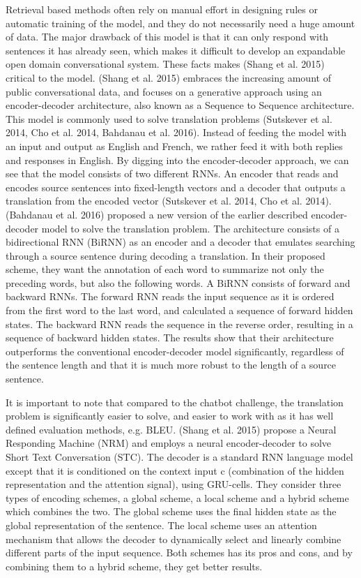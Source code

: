 \documentclass{article} %
\begin{document}
Retrieval based methods often rely on manual effort in designing rules or  automatic training of the model, and they do not necessarily need a huge amount of data. The major drawback of this model is that it can only respond with sentences it has already seen, which makes it difficult to develop an expandable open domain conversational system. These facts makes (Shang et al. 2015) critical to the model. (Shang et al. 2015) embraces the increasing amount of public conversational data, and focuses on a generative approach using an encoder-decoder architecture, also known as a Sequence to Sequence architecture. This model is commonly used to solve translation problems (Sutskever et al. 2014, Cho et al. 2014, Bahdanau et al. 2016). Instead of feeding the model with an input and output as English and French, we rather feed it with both replies and  responses in English. By digging into the encoder-decoder approach, we can see that the model consists of two different RNNs. An encoder that reads and encodes source sentences into fixed-length vectors and a decoder that outputs a translation from the encoded vector (Sutskever et al. 2014, Cho et al. 2014). (Bahdanau et al. 2016) proposed a new version of the earlier described encoder-decoder model to solve the translation problem. The architecture consists of a bidirectional RNN (BiRNN) as an encoder and a decoder that emulates searching through a source sentence during decoding a translation. In their proposed scheme, they want the annotation of each word to summarize not only the preceding words, but also the following words. A BiRNN consists of forward and backward RNNs. The forward RNN reads the input sequence as it is ordered from the first word to the last word, and calculated a sequence of forward hidden states. The backward RNN reads the sequence in the reverse order, resulting in a sequence of backward hidden states. The results show that their architecture outperforms the conventional encoder-decoder model significantly, regardless of the sentence length and that it is much more robust to the length of a source sentence.

It is important to note that compared to the chatbot challenge, the translation problem is significantly easier to solve, and easier to work with as it has well defined evaluation methods, e.g. BLEU. (Shang et al. 2015) propose a Neural Responding Machine (NRM) and employs a neural encoder-decoder to solve Short Text Conversation (STC). The decoder is a standard RNN language model except that it is conditioned on the context input c (combination of the hidden representation and the attention signal), using GRU-cells. They consider three types of encoding schemes, a global scheme, a local scheme and a hybrid scheme which combines the two. The global scheme uses the final hidden state as the global representation of the sentence. The local scheme uses an attention mechanism that allows the decoder to dynamically select and linearly combine different parts of the input sequence. Both schemes has its pros and cons, and by combining them to a hybrid scheme, they get better results. 
\end{document}

